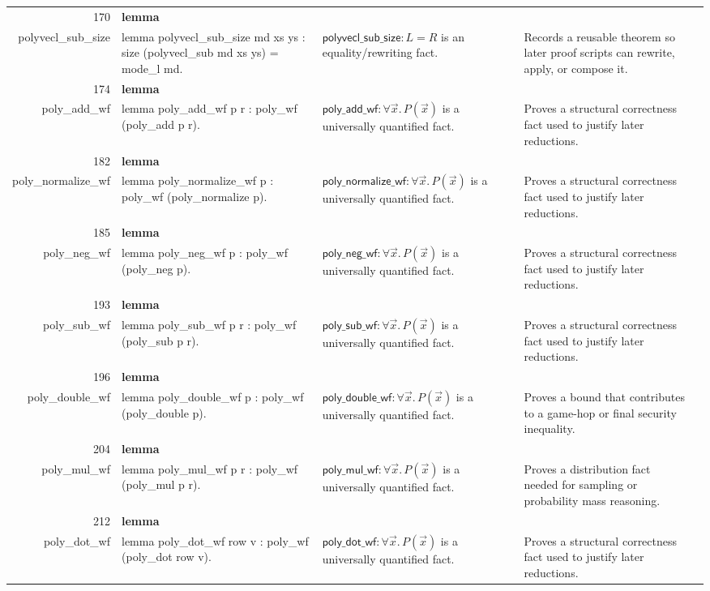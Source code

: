 \documentclass[10pt]{article}
\newcommand{\ec}[1]{\begingroup\ttfamily\scriptsize #1\endgroup}
\begin{document}
\begin{longtable}{r L{0.17\textwidth} L{0.26\textwidth} L{0.27\textwidth} L{0.20\textwidth}}
170 & \textbf{lemma}\\\ec{polyvecl\_sub\_size} & \ec{lemma polyvecl\_sub\_size md xs ys : size (polyvecl\_sub md xs ys) = mode\_l md.} & \(\mathsf{polyvecl\_sub\_size} : L = R\) is an equality/rewriting fact. & Records a reusable theorem so later proof scripts can rewrite, apply, or compose it. \\
174 & \textbf{lemma}\\\ec{poly\_add\_wf} & \ec{lemma poly\_add\_wf p r : poly\_wf (poly\_add p r).} & \(\mathsf{poly\_add\_wf} : \forall \vec{x}.\, P(\vec{x})\) is a universally quantified fact. & Proves a structural correctness fact used to justify later reductions. \\
182 & \textbf{lemma}\\\ec{poly\_normalize\_wf} & \ec{lemma poly\_normalize\_wf p : poly\_wf (poly\_normalize p).} & \(\mathsf{poly\_normalize\_wf} : \forall \vec{x}.\, P(\vec{x})\) is a universally quantified fact. & Proves a structural correctness fact used to justify later reductions. \\
185 & \textbf{lemma}\\\ec{poly\_neg\_wf} & \ec{lemma poly\_neg\_wf p : poly\_wf (poly\_neg p).} & \(\mathsf{poly\_neg\_wf} : \forall \vec{x}.\, P(\vec{x})\) is a universally quantified fact. & Proves a structural correctness fact used to justify later reductions. \\
193 & \textbf{lemma}\\\ec{poly\_sub\_wf} & \ec{lemma poly\_sub\_wf p r : poly\_wf (poly\_sub p r).} & \(\mathsf{poly\_sub\_wf} : \forall \vec{x}.\, P(\vec{x})\) is a universally quantified fact. & Proves a structural correctness fact used to justify later reductions. \\
196 & \textbf{lemma}\\\ec{poly\_double\_wf} & \ec{lemma poly\_double\_wf p : poly\_wf (poly\_double p).} & \(\mathsf{poly\_double\_wf} : \forall \vec{x}.\, P(\vec{x})\) is a universally quantified fact. & Proves a bound that contributes to a game-hop or final security inequality. \\
204 & \textbf{lemma}\\\ec{poly\_mul\_wf} & \ec{lemma poly\_mul\_wf p r : poly\_wf (poly\_mul p r).} & \(\mathsf{poly\_mul\_wf} : \forall \vec{x}.\, P(\vec{x})\) is a universally quantified fact. & Proves a distribution fact needed for sampling or probability mass reasoning. \\
212 & \textbf{lemma}\\\ec{poly\_dot\_wf} & \ec{lemma poly\_dot\_wf row v : poly\_wf (poly\_dot row v).} & \(\mathsf{poly\_dot\_wf} : \forall \vec{x}.\, P(\vec{x})\) is a universally quantified fact. & Proves a structural correctness fact used to justify later reductions. \\

\end{longtable}
\end{document}
